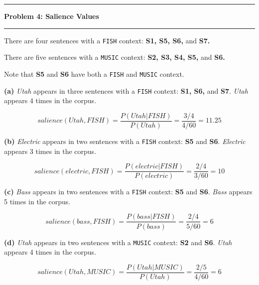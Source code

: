 \documentclass[11pt]{article}
\newcommand\question[2]{\vspace{.25in}\hrule\textbf{#1: #2}\vspace{.5em}\hrule\vspace{.10in}}
\renewcommand\part[1]{\vspace{.10in}\textbf{(#1)}}
\begin{document}
\question{Problem 4}{Salience Values}
There are four sentences with a {\tt FISH} context: \textbf{S1, S5, S6,} and \textbf{S7.}

There are five sentences with a {\tt MUSIC} context: \textbf{S2, S3, S4, S5,} and \textbf{S6.}

Note that \textbf{S5} and \textbf{S6} have both a {\tt FISH} and {\tt MUSIC} context.

\part{a} \textit{Utah} appears in three sentences with a {\tt FISH} context: \textbf{S1, S6,} and \textbf{S7}. \textit{Utah} appears 4 times in the corpus.

$$salience(Utah, FISH) = \frac{P(Utah | FISH)}{P(Utah)} = \frac{3/4}{4/60} = 11.25$$


\part{b} \textit{Electric} appears in two sentences with a {\tt FISH} context: \textbf{S5} and \textbf{S6}. \textit{Electric} appears 3 times in the corpus.

$$salience(electric, FISH) = \frac{P(electric | FISH)}{P(electric)} = \frac{2/4}{3/60} = 10$$


\part{c} \textit{Bass} appears in two sentences with a {\tt FISH} context: \textbf{S5} and \textbf{S6}. \textit{Bass} appears 5 times in the corpus.

$$salience(bass, FISH) = \frac{P(bass | FISH)}{P(bass)} = \frac{2/4}{5/60} = 6$$


\part{d} \textit{Utah} appears in two sentences with a {\tt MUSIC} context: \textbf{S2} and \textbf{S6}. \textit{Utah} appears 4 times in the corpus.

$$salience(Utah, MUSIC) = \frac{P(Utah | MUSIC)}{P(Utah)} = \frac{2/5}{4/60} = 6$$
\end{document}

